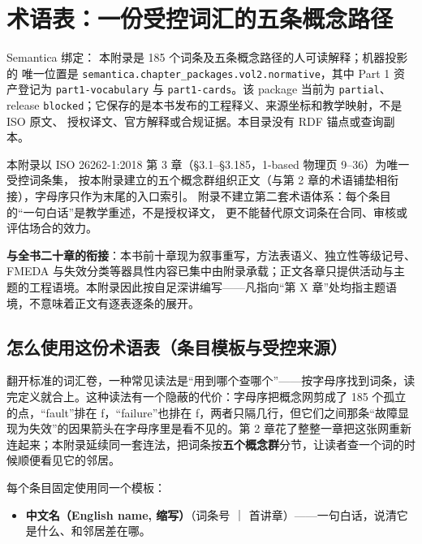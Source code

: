 \chapter{术语表：一份受控词汇的五条概念路径}
\setcounter{section}{-1}

\begin{noteblock}
Semantica 绑定： 本附录是 185 个词条及五条概念路径的人可读解释；机器投影的
唯一位置是 \nolinkurl{semantica.chapter_packages.vol2.normative}，其中 Part 1 资产登记为
\nolinkurl{part1-vocabulary} 与 \nolinkurl{part1-cards}。该 package 当前为 \nolinkurl{partial}、release
\nolinkurl{blocked}；它保存的是本书发布的工程释义、来源坐标和教学映射，不是 ISO 原文、
授权译文、官方解释或合规证据。本目录没有 RDF 锚点或查询副本。
\end{noteblock}

\begin{noteblock}
本附录以 ISO 26262-1:2018 第 3 章（§3.1–§3.185，1-based 物理页 9–36）为唯一受控词条集，
按本附录建立的五个概念群组织正文（与第 2 章的术语铺垫相衔接），字母序只作为末尾的入口索引。
附录不建立第二套术语体系：每个条目的“一句白话”是教学重述，不是授权译文，
更不能替代原文词条在合同、审核或评估场合的效力。

\textbf{与全书二十章的衔接}：本书前十章现为叙事重写，方法表语义、独立性等级记号、FMEDA 与失效分类等器具性内容已集中由附录承载；正文各章只提供活动与主题的工程语境。本附录因此按自足深讲编写——凡指向“第 X 章”处均指主题语境，不意味着正文有逐表逐条的展开。
\end{noteblock}

\section{怎么使用这份术语表（条目模板与受控来源）}

翻开标准的词汇卷，一种常见读法是“用到哪个查哪个”——按字母序找到词条，读完定义就合上。这种读法有一个隐蔽的代价：字母序把概念网剪成了 185 个孤立的点，“fault”排在 f，“failure”也排在 f，两者只隔几行，但它们之间那条“故障显现为失效”的因果箭头在字母序里是看不见的。第 2 章花了整整一章把这张网重新连起来；本附录延续同一套连法，把词条按\textbf{五个概念群}分节，让读者查一个词的时候顺便看见它的邻居。

每个条目固定使用同一个模板：

\begin{itemize}
\item \textbf{中文名（English name, 缩写）}（词条号 ｜ 首讲章）——一句白话，说清它是什么、和邻居差在哪。
\end{itemize}

